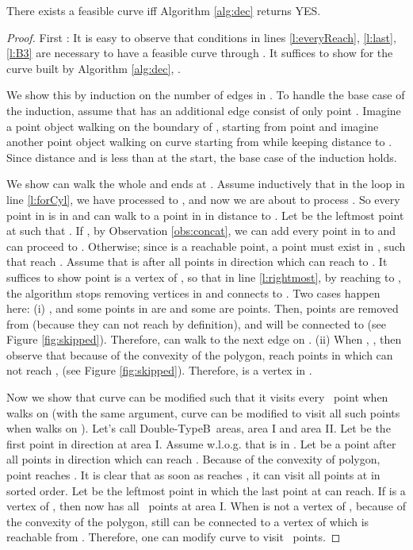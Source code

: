 \documentclass[a4paper,UKenglish]{lipics}
\newcommand{\DoubleB}{Double-TypeB}
\begin{document}
\begin{lemma} \label{lemma:last}
There exists a feasible curve iff Algorithm \ref{alg:dec} returns
YES.
\end{lemma}
\begin{proof}
First  :
It is easy to observe that 
conditions in lines  
\ref{l:everyReach},
\ref{l:last},
\ref{l:B3} are necessary
to have a feasible curve 
through .
It suffices to show for the curve 
 built by Algorithm \ref{alg:dec}, .

We show this by induction on the 
number of edges in .
To handle the base case of the induction, assume that 
 has an additional edge consist 
of only point .
Imagine a point object 
walking on the boundary of , starting from 
point  and imagine another point object 
walking on curve  starting from  while 
keeping distance  to  .
Since distance  and  is less 
than  at the start,
the base case of the induction holds. 

We show  can walk the whole  
and ends at .
Assume inductively that in the loop in line \ref{l:forCyl},
we have processed  to  , 
and now we are about to process .
So every point in  is in 
 and  can walk to a point 
in  in  distance to .
Let  be the leftmost point at   such that 
.
If , by Observation \ref{obs:concat}, 
we can add  every point in  to  
and  can proceed to . Otherwise;
	since  is a reachable point, a point 
	 must exist in ,  such that 
	 reach . Assume that 
	 is after all points in direction 
	which can reach to .
	It suffices to show point  is a vertex of , 
	so that in line \ref{l:rightmost}, by reaching to , 
	the algorithm stops removing vertices in 
	and connects  to .
	Two cases happen here: 
     (i) , and  some points in  are 
	 and some are  points.
    Then,  points are removed 
	from  (because they can not reach  by definition), 
	and  will be connected to	 (see Figure \ref{fig:skipped}).
	Therefore,  can walk to the next edge on . 
     (ii) When , , then observe that because of 
the convexity of the polygon,  reach
points in  which can not reach ,  (see Figure \ref{fig:skipped}). 
Therefore,  is a vertex in . 

Now we show that curve  can be modified such 
that it visits every \TwiceB ~point when  walks on 
(with the same argument, curve  can be modified to 
visit all such points when  walks on ).
Let's call \DoubleB~areas, area I and area II.
Let  be the first  point in 
direction  at area I. 
Assume w.l.o.g. that  is in .
Let  be a point after all points in direction 
which can reach .
Because of the convexity of polygon,
point  reaches . 
It is clear that as soon as   reaches , 
it can visit all  points 
at  in sorted  order. 
Let  be the leftmost point 
in  which the last 
  point at  can reach. 
If  is a vertex of , then
 now has all  \TwiceB ~points at area I.
When  is not a vertex of ,
because of the convexity of the polygon, 
still  can be connected to a 
vertex of  which is reachable from . 
Therefore, one can modify curve 
to visit \TwiceB ~points.







\end{proof}
\end{document}
